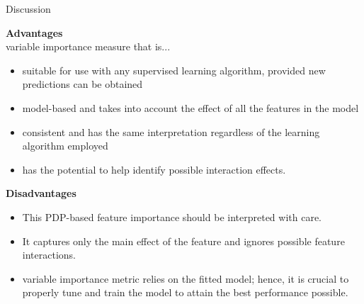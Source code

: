 \documentclass[11pt,compress,t,notes=noshow, aspectratio=169, xcolor=table]{beamer}
\begin{document}
\begin{vbframe}{Discussion}

\textbf{Advantages} \\
variable importance measure that is...
\begin{itemize}
    \item  suitable for use with any supervised learning algorithm, provided new predictions can be obtained
    \item model-based and takes into account the effect of all the features in the model
    \item consistent and has the same interpretation regardless of the learning algorithm employed
    \item has the potential to help identify possible interaction effects.
\end{itemize}

\textbf{Disadvantages} \\
\begin{itemize}
    \item This PDP-based feature importance should be interpreted with care.
    \item It captures only the main effect of the feature and ignores possible feature interactions.
    \item variable importance metric relies on the fitted model; hence, it is crucial to properly tune and train the model to attain the best performance possible.
\end{itemize}
% 
\end{vbframe}
\endlecture
\end{document}
